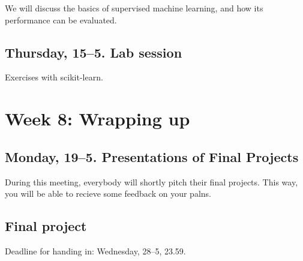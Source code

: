 We will discuss the basics of supervised machine learning, and how its performance can be evaluated. 

\subsection*{Thursday, 15--5. Lab session}
Exercises with scikit-learn.

\section*{Week 8: Wrapping up}

\subsection*{Monday, 19--5. Presentations of Final Projects}
During this meeting, everybody will shortly pitch their final projects. This way, you will be able to recieve some feedback on your palns. 

\subsection*{Final project}
Deadline for handing in: Wednesday, 28--5, 23.59.

